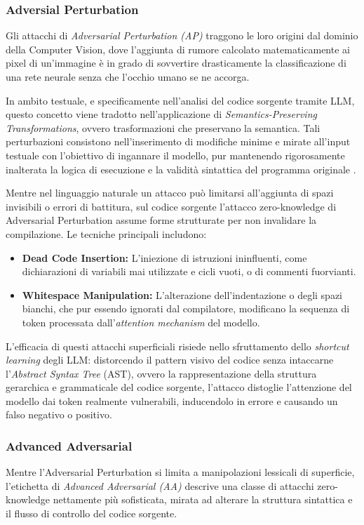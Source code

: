 \subsubsection{Adversial Perturbation}
Gli attacchi di \textit{Adversarial Perturbation (AP)} traggono le loro origini dal dominio della Computer Vision, dove l'aggiunta di rumore calcolato matematicamente ai pixel di un'immagine è in grado di sovvertire drasticamente la classificazione di una rete neurale senza che l'occhio umano se ne accorga. 

In ambito testuale, e specificamente nell'analisi del codice sorgente tramite LLM, questo concetto viene tradotto nell'applicazione di \textit{Semantics-Preserving Transformations}, ovvero trasformazioni che preservano la semantica. Tali perturbazioni consistono nell'inserimento di modifiche minime e mirate all'input testuale con l'obiettivo di ingannare il modello, pur mantenendo rigorosamente inalterata la logica di esecuzione e la validità sintattica del programma originale \cite{yefet2020adversarialexamplesmodelscode}.

Mentre nel linguaggio naturale un attacco può limitarsi all'aggiunta di spazi invisibili o errori di battitura, sul codice sorgente l'attacco zero-knowledge di Adversarial Perturbation assume forme strutturate per non invalidare la compilazione. Le tecniche principali includono:
\begin{itemize}
    \item \textbf{Dead Code Insertion:} L'iniezione di istruzioni ininfluenti, come dichiarazioni di variabili mai utilizzate e cicli vuoti, o di commenti fuorvianti.
    \item \textbf{Whitespace Manipulation:} L'alterazione dell'indentazione o degli spazi bianchi, che pur essendo ignorati dal compilatore, modificano la sequenza di token processata dall'\textit{attention mechanism} del modello.
\end{itemize}

L'efficacia di questi attacchi superficiali risiede nello sfruttamento dello \textit{shortcut learning} degli LLM: distorcendo il pattern visivo del codice senza intaccarne l'\textit{Abstract Syntax Tree} (AST), ovvero la rappresentazione della struttura gerarchica e grammaticale del codice sorgente, l'attacco distoglie l'attenzione del modello dai token realmente vulnerabili, inducendolo in errore e causando un falso negativo o positivo.

\subsubsection{Advanced Adversarial}
Mentre l'Adversarial Perturbation si limita a manipolazioni lessicali di superficie, l'etichetta di \textit{Advanced Adversarial (AA)} descrive una classe di attacchi zero-knowledge nettamente più sofisticata, mirata ad alterare la struttura sintattica e il flusso di controllo del codice sorgente. 

